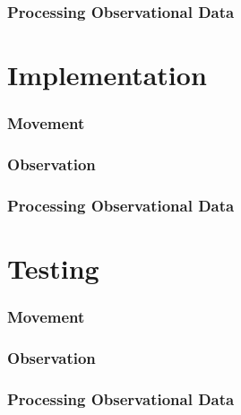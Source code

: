 		\subsection{Processing Observational Data}
		
	\chapter{Implementation}
		\subsection{Movement}
		\subsection{Observation}
		\subsection{Processing Observational Data}
		
	\chapter{Testing}
		\subsection{Movement}
		\subsection{Observation}
		\subsection{Processing Observational Data}